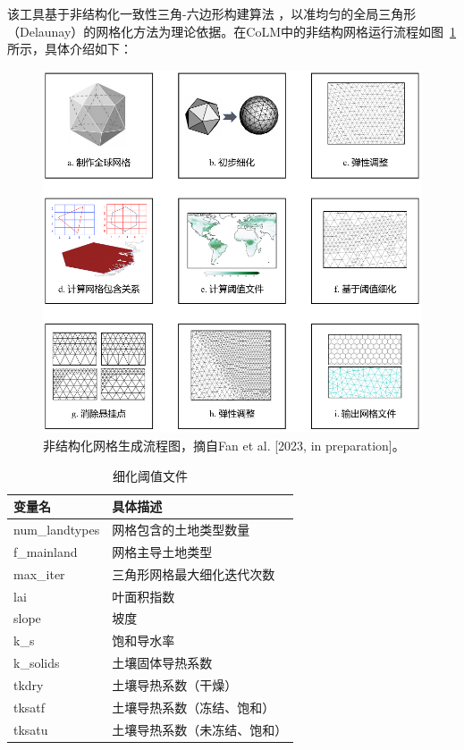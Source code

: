 该工具基于非结构化一致性三角-六边形构建算法 \citep{fatichi2020soil,walko2008ocean,walko_direct_2011}，以准均匀的全局三角形（Delaunay）的网格化方法为理论依据。在CoLM中的非结构网格运行流程如图~\ref{fig:非结构化网格生成流程图} 所示，具体介绍如下：
{
\begin{figure}[htbp]
\centering
\includegraphics{Figures/模式构架/非结构化网格生成流程图.png}
\caption{非结构化网格生成流程图，摘自Fan et al. [2023, in preparation]。}
\label{fig:非结构化网格生成流程图}
\end{figure}
}

{
\begin{table}[htbp]
\centering
\caption{细化阈值文件}
\label{tab:细化阈值文件}
\begin{tabular}{@{}ll@{}}
\toprule
变量名            & 具体描述           \\\midrule
num\_landtypes & 网格包含的土地类型数量    \\
f\_mainland    & 网格主导土地类型       \\
max\_iter      & 三角形网格最大细化迭代次数  \\
lai            & 叶面积指数          \\
slope          & 坡度             \\
k\_s           & 饱和导水率          \\
k\_solids      & 土壤固体导热系数       \\
tkdry          & 土壤导热系数（干燥）     \\
tksatf         & 土壤导热系数（冻结、饱和）  \\
tksatu         & 土壤导热系数（未冻结、饱和） \\\bottomrule
\end{tabular}
\end{table}
}

